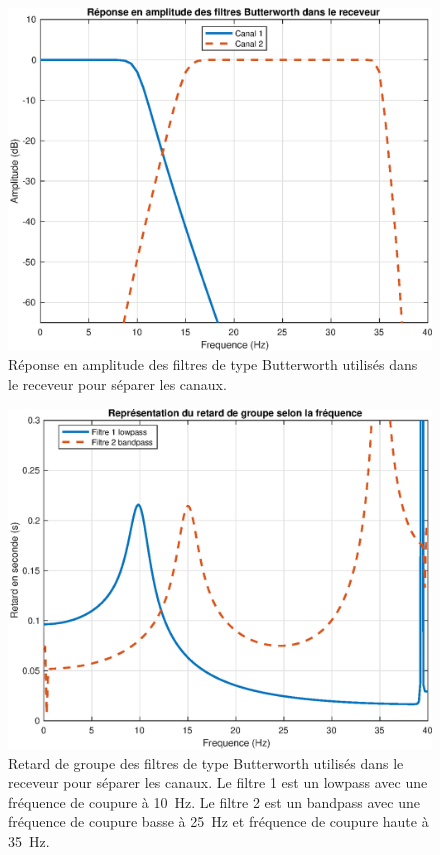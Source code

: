 \documentclass[10pt, oneside, a4paper]{article}
\begin{document}
\begin{figure}[p]
	\centering
	\includegraphics[height=0.4\textheight]{eps/filters.eps}
	\caption{Réponse en amplitude des filtres de type Butterworth utilisés dans le receveur
			 pour séparer les canaux.}
	\label{fig:filters}
\end{figure}

\begin{figure}[p]
	\centering
	\includegraphics[height=0.45\textheight]{eps/grpdelay.eps}
	\caption{Retard de groupe des filtres de type Butterworth utilisés dans le receveur
			 pour séparer les canaux.
			 Le filtre 1 est un lowpass avec une fréquence de coupure à \SI{10}{\hertz}.
			 Le filtre 2 est un bandpass avec une fréquence de coupure basse à
			 \SI{25}{\hertz} et fréquence de coupure haute à \SI{35}{\hertz}.}
	\label{fig:grpdelay}
\end{figure}
\end{document}
